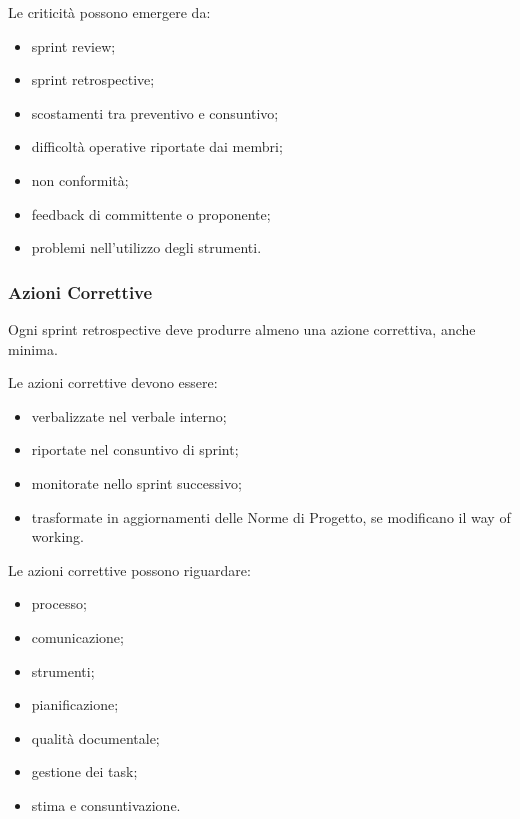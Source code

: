 Le criticità possono emergere da:

\begin{itemize}
    \item sprint review;
    \item sprint retrospective;
    \item scostamenti tra preventivo e consuntivo;
    \item difficoltà operative riportate dai membri;
    \item non conformità;
    \item feedback di committente o proponente;
    \item problemi nell'utilizzo degli strumenti.
\end{itemize}


\subsubsection{Azioni Correttive}

Ogni sprint retrospective deve produrre almeno una azione correttiva, anche minima.

Le azioni correttive devono essere:

\begin{itemize}
    \item verbalizzate nel verbale interno;
    \item riportate nel consuntivo di sprint;
    \item monitorate nello sprint successivo;
    \item trasformate in aggiornamenti delle Norme di Progetto, se modificano il
    way of working.
\end{itemize}

Le azioni correttive possono riguardare:

\begin{itemize}
    \item processo;
    \item comunicazione;
    \item strumenti;
    \item pianificazione;
    \item qualità documentale;
    \item gestione dei task;
    \item stima e consuntivazione.
\end{itemize}



